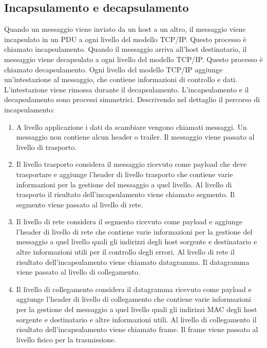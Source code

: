 \documentclass[12pt]{report}
\begin{document}
	\subsection{Incapsulamento e decapsulamento}
	Quando un messaggio viene inviato da un host a un altro, il messaggio viene incapsulato in un PDU a ogni livello del modello TCP/IP. Questo processo è chiamato incapsulamento. Quando il messaggio arriva all'host destinatario, il messaggio viene decapsulato a ogni livello del modello TCP/IP. Questo processo è chiamato decapsulamento. Ogni livello del modello TCP/IP aggiunge un'intestazione al messaggio, che contiene informazioni di controllo e dati. L'intestazione viene rimossa durante il decapsulamento. L'incapsulamento e il decapsulamento sono processi simmetrici.
	Descrivendo nel dettaglio il percorso di incapsulamento:
	\begin{enumerate}
		\item A livello applicazione i dati da scambiare vengono chiamati messaggi. Un messaggio non contiene alcun header o trailer. Il messaggio viene passato al livello di trasporto.

		\item Il livello trasporto considera il messaggio ricevuto come payload che deve trasportare e aggiunge l'header di livello trasporto che contiene varie informazioni per la gestione del messaggio a quel livello. Al livello di trasporto il risultato dell'incapsulamento viene chiamato segmento. Il segmento viene passato al livello di rete.

		\item Il livello di rete considera il segmento ricevuto come payload e aggiunge l'header di livello di rete che contiene varie informazioni per la gestione del messaggio a quel livello quali gli indirizzi degli host sorgente e destinatario e altre informazioni utili per il controllo degli errori. Al livello di rete il risultato dell'incapsulamento viene chiamato datagramma. Il datagramma viene passato al livello di collegamento.
		
		\item Il livello di collegamento considera il datagramma ricevuto come payload e aggiunge l'header di livello di collegamento che contiene varie informazioni per la gestione del messaggio a quel livello quali gli indirizzi MAC degli host sorgente e destinatario e altre informazioni utili. Al livello di collegamento il risultato dell'incapsulamento viene chiamato frame. Il frame viene passato al livello fisico per la trasmissione.
	\end{enumerate}
\end{document}
